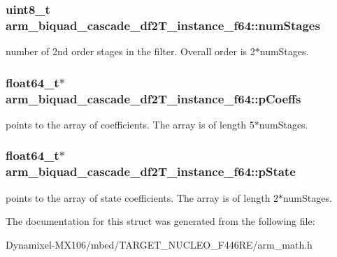 \subsubsection[{\texorpdfstring{num\+Stages}{numStages}}]{\setlength{\rightskip}{0pt plus 5cm}uint8\+\_\+t arm\+\_\+biquad\+\_\+cascade\+\_\+df2\+T\+\_\+instance\+\_\+f64\+::num\+Stages}\hypertarget{structarm__biquad__cascade__df2_t__instance__f64_ad55380ff835b533aa5168f836db8a4de}{}\label{structarm__biquad__cascade__df2_t__instance__f64_ad55380ff835b533aa5168f836db8a4de}
number of 2nd order stages in the filter. Overall order is 2$\ast$num\+Stages. 
\subsubsection[{\texorpdfstring{p\+Coeffs}{pCoeffs}}]{\setlength{\rightskip}{0pt plus 5cm}float64\+\_\+t$\ast$ arm\+\_\+biquad\+\_\+cascade\+\_\+df2\+T\+\_\+instance\+\_\+f64\+::p\+Coeffs}\hypertarget{structarm__biquad__cascade__df2_t__instance__f64_ae2f0180f9038c0393e1d6921bb3b878b}{}\label{structarm__biquad__cascade__df2_t__instance__f64_ae2f0180f9038c0393e1d6921bb3b878b}
points to the array of coefficients. The array is of length 5$\ast$num\+Stages. 
\subsubsection[{\texorpdfstring{p\+State}{pState}}]{\setlength{\rightskip}{0pt plus 5cm}float64\+\_\+t$\ast$ arm\+\_\+biquad\+\_\+cascade\+\_\+df2\+T\+\_\+instance\+\_\+f64\+::p\+State}\hypertarget{structarm__biquad__cascade__df2_t__instance__f64_a0bde57b618e3f9059b23b0de64e12ce3}{}\label{structarm__biquad__cascade__df2_t__instance__f64_a0bde57b618e3f9059b23b0de64e12ce3}
points to the array of state coefficients. The array is of length 2$\ast$num\+Stages. 

The documentation for this struct was generated from the following file\+:\begin{DoxyCompactItemize}
\item 
Dynamixel-\/\+M\+X106/mbed/\+T\+A\+R\+G\+E\+T\+\_\+\+N\+U\+C\+L\+E\+O\+\_\+\+F446\+R\+E/arm\+\_\+math.\+h\end{DoxyCompactItemize}
